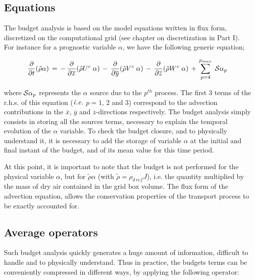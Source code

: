 \subsection{Equations}

 The budget analysis is based on the model equations written in flux form,
discretized on the computational grid 
(see chapter on discretization in Part I).
 For instance for a prognostic variable
$\alpha$, we have the following generic equation;

\begin{equation}
\dfrac{\partial}{\partial t}(\tilde{\rho}\alpha) \, = \, - \,
 \dfrac{\partial }{\partial \overline{x}} (\tilde{\rho} U^{c} \;  \alpha)
\, - \, \dfrac{\partial }{\partial \overline{y}} (\tilde{\rho} V^{c} \;  \alpha)
\, - \, \dfrac{\partial }{\partial \overline{z}} (\tilde{\rho} W^{c} \;  \alpha)
\, + \, \sum_{p=4}^{p_{max}} \; {\cal S}\alpha_p
\end{equation}

\noindent where ${\cal S}\alpha_p$ represents the $\alpha$ source
due to the $p^{th}$ process. The first 3 terms of the r.h.s. of this equation
($\it i.e.$ $p= 1$, $2$ and $3$) correspond to the advection contributions in the
$\overline{x}$, $\overline{y}$ and $\overline{z}$-directions respectively.
The budget analysis simply consists in storing all the sources terms,
necessary to explain the temporal evolution of the $\alpha$ variable.
To check the budget closure, and to physically understand it, it is necessary to
add the storage of variable $\alpha$ at the initial and final instant
of the budget, and of its mean value for this time period.

 At this point, it is important to note that the budget is not performed for the
physical variable $\alpha$, but for $\tilde{\rho}\alpha$
(with $\tilde{\rho}  = \rho_{d\,ref} J$), i.e. the quantity multiplied
by the mass of dry
air contained in the grid box volume. The flux form of the advection equation,
allows the conservation properties of the transport process to be exactly
accounted for.

\subsection{Average operators}

 Such budget analysis quickly generates a huge amount of information, difficult
to handle and to physically understand. Thus in practice, the budgets terms
can be conveniently compressed in different ways, by applying the following
operator:

